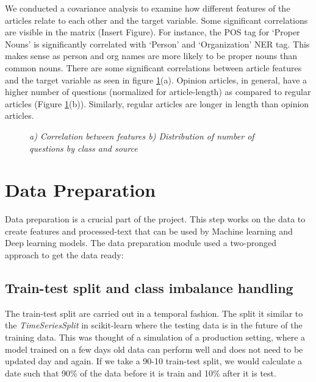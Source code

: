 \documentclass[11pt]{article}
\begin{document}
We conducted a covariance analysis to examine how different features of the articles relate to each other and the target variable. Some significant correlations are visible in the matrix (Insert Figure). For instance, the POS tag for `Proper Nouns' is significantly correlated with `Person' and `Organization' NER tag. This makes sense as person and org names are more likely to be proper nouns than common nouns. There are some significant correlations between article features and the target variable as seen in figure \ref{fig:correlation}(a). Opinion articles, in general, have a higher number of questions  (normalized for article-length) as compared to regular articles (Figure \ref{fig:correlation}(b)). Similarly, regular articles are longer in length than opinion articles. 

\begin{figure}[!htb]
\caption{\label{fig:correlation} \textit{a) Correlation between features b) Distribution of number of questions by class and source}}
\end{figure}

\section{Data Preparation}
\label{sec:dataprep}
Data preparation is a crucial part of the project. This step works on the data to create features and processed-text that can be used by Machine learning and Deep learning models. The data preparation module used a two-pronged approach to get the data ready:

\subsection{Train-test split and class imbalance handling}
The train-test split are carried out in a temporal fashion. The split it similar to the \textit{TimeSeriesSplit} in scikit-learn where the testing data is in the future of the training data. This was thought of a simulation of a production setting, where a model trained on a few days old data can perform well and does not need to be updated day and again. If we take a 90-10 train-test split, we would calculate a date such that 90\% of the data before it is train and 10\% after it is test. 
\end{document}
